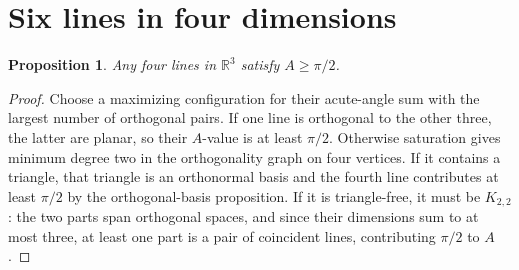 \documentclass[11pt]{article}
\newtheorem{proposition}{Proposition}
\begin{document}
\section*{Six lines in four dimensions}

\begin{proposition}
Any four lines in $\mathbb R^3$ satisfy $A\geq\pi/2$.
\end{proposition}
\begin{proof}
Choose a maximizing configuration for their acute-angle sum with
the largest number of orthogonal pairs.  If one line is orthogonal
to the other three, the latter are planar, so their $A$-value is
at least $\pi/2$.  Otherwise saturation gives minimum degree two
in the orthogonality graph on four vertices.  If it contains a
triangle, that triangle is an orthonormal basis and the fourth line
contributes at least $\pi/2$ by the orthogonal-basis proposition.
If it is triangle-free, it must be $K_{2,2}$: the two parts span
orthogonal spaces, and since their dimensions sum to at most three,
at least one part is a pair of coincident lines, contributing
$\pi/2$ to $A$.
\end{proof}
\end{document}
